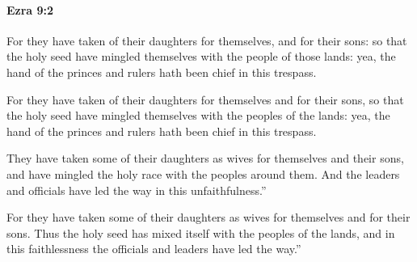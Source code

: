 		\paragraph{Ezra 9:2} %
			\label{EZRA-9-2}

			For they have taken of their daughters for themselves, and for their sons: so that the holy seed have mingled themselves with the people of those lands: yea, the hand of the princes and rulers hath been chief in this trespass.

			\begin{versebox}
					\item[BHS] 
					\item[LXX] 
					\item[ASV] For they have taken of their daughters for themselves and for their sons, so that the holy seed have mingled themselves with the peoples of the lands: yea, the hand of the princes and rulers hath been chief in this trespass.
					\item[NIV] They have taken some of their daughters as wives for themselves and their sons, and have mingled the holy race with the peoples around them. And the leaders and officials have led the way in this unfaithfulness.”
					\item[NRSV] For they have taken some of their daughters as wives for themselves and for their sons. Thus the holy seed has mixed itself with the peoples of the lands, and in this faithlessness the officials and leaders have led the way.”
			\end{versebox}

